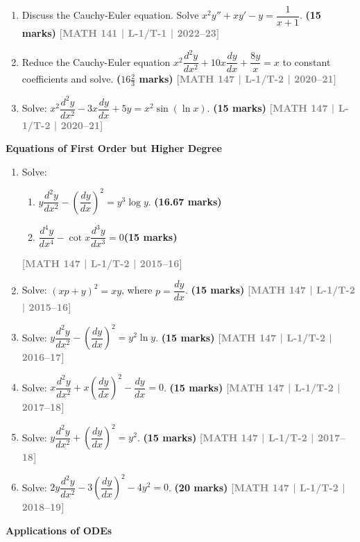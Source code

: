 \documentclass[12pt,a4paper]{article}
\newcommand{\yr}[1]{\hfill\textcolor{gray}{\small\textbf{[#1]}}}
\newcommand{\mk}[1]{\textcolor{orange!70!black}{\small\textbf{(#1 marks)}}}
\newcommand{\subtopic}[2]{%
  \vspace{10pt}
  \noindent\begin{tcolorbox}[colback=#1!8,colframe=#1,boxrule=0.6pt,arc=4pt,
    left=6pt,right=6pt,top=4pt,bottom=4pt]
    \small\bfseries\textcolor{#1}{#2}
  \end{tcolorbox}
  \vspace{2pt}
}
\begin{document}
\begin{enumerate}
\item Discuss the Cauchy-Euler equation. Solve $x^{2}y''+xy'-y=\dfrac{1}{x+1}$.
\mk{15} \yr{MATH 141 | L-1/T-1 | 2022--23}

\item Reduce the Cauchy-Euler equation $x^{2}\dfrac{d^{2}y}{dx^{2}}+10x\dfrac{dy}{dx}+\dfrac{8y}{x}=x$ to constant coefficients and solve.
\mk{$16\tfrac{2}{3}$} \yr{MATH 147 | L-1/T-2 | 2020--21}

\item Solve: $x^{2}\dfrac{d^{2}y}{dx^{2}}-3x\dfrac{dy}{dx}+5y=x^{2}\sin(\ln x)$.
\mk{15} \yr{MATH 147 | L-1/T-2 | 2020--21}

\end{enumerate}

\subtopic{cC}{Equations of First Order but Higher Degree}
\label{sub:s3-higherdeg}

\begin{enumerate}
\item Solve:
\begin{enumerate}
\item $y\dfrac{d^{2}y}{dx^{2}}-\left(\dfrac{dy}{dx}\right)^{2}=y^{3}\log y$. \mk{16.67}
\item $\dfrac{d^{4}y}{dx^{4}}-\cot{x}\dfrac{d^{3}y}{dx^{3}}=0$\mk{15} 
\end{enumerate}  
\yr{MATH 147 | L-1/T-2 | 2015--16}
\item Solve: $(xp+y)^{2}=xy$, where $p=\dfrac{dy}{dx}$.
\mk{15} \yr{MATH 147 | L-1/T-2 | 2015--16}

\item Solve: $y\dfrac{d^{2}y}{dx^{2}}-\left(\dfrac{dy}{dx}\right)^{2}=y^{2}\ln y$.
\mk{15} \yr{MATH 147 | L-1/T-2 | 2016--17}

\item Solve: $x\dfrac{d^{2}y}{dx^{2}}+x\left(\dfrac{dy}{dx}\right)^{2}-\dfrac{dy}{dx}=0$.
\mk{15} \yr{MATH 147 | L-1/T-2 | 2017--18}

\item Solve: $y\dfrac{d^{2}y}{dx^{2}}+\left(\dfrac{dy}{dx}\right)^{2}=y^{2}$.
\mk{15} \yr{MATH 147 | L-1/T-2 | 2017--18}

\item Solve: $2y\dfrac{d^{2}y}{dx^{2}}-3\left(\dfrac{dy}{dx}\right)^{2}-4y^{2}=0$.
\mk{20} \yr{MATH 147 | L-1/T-2 | 2018--19}

\end{enumerate}


\subtopic{cC}{Applications of ODEs}
\label{sub:s3-applications}
\end{document}
